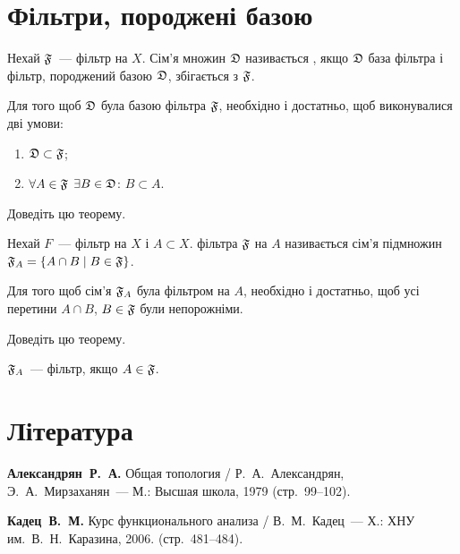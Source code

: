 \section{Фільтри, породжені базою}

\begin{definition}
    Нехай $\frak F$~--- фільтр на $X$. Сім'я множин $\frak D$ називається , якщо $\frak D$ база фільтра і фільтр, породжений базою $\frak D$, збігається з $\frak F$.
\end{definition}

\begin{theorem}
    \label{th:filterbase-criterion}
    Для того щоб $\frak D$ була базою фільтра $\frak F$, необхідно і достатньо, щоб виконувалися дві умови:
    \begin{enumerate}
        \item $\frak D \subset \frak F$;
        \item $\forall A \in \frak F$ $\exists B \in \frak D$: $B \subset A$.
    \end{enumerate}
\end{theorem}

\begin{exercise}
    Доведіть цю теорему.
\end{exercise}

\begin{definition}
    Нехай $F$~--- фільтр на $X$ і $A \subset X$.  фільтра $\frak F$ на $A$ називається сім'я підмножин $\frak F_A = \{ A \cap B \mid B \in \frak F\}$.
\end{definition}

\begin{theorem}
    \label{th:filter-restriction-criterion}
    Для того щоб сім'я $\frak F_A$ була фільтром на $A$, необхідно і достатньо, щоб усі перетини $A \cap B$, $B \in \frak F$ були непорожніми.
\end{theorem}

\begin{exercise}
    Доведіть цю теорему.
\end{exercise}

\begin{corollary}
    $\frak F_A$~--- фільтр, якщо $A \in \frak F$.
\end{corollary}

\section{Література}

\begin{enumerate}[label={[\arabic*]}]
\item \textbf{Александрян~Р.~А.}
Общая топология /
Р.~А.~Александрян, Э.~А.~Мирзаханян~---
М.: Высшая школа, 1979 (стр.~99--102).
\item \textbf{Кадец~В.~М.}
Курс функционального анализа /
В.~М.~Кадец~---
Х.: ХНУ им.~В.~Н.~Каразина, 2006. (стр.~481--484).
\end{enumerate}
